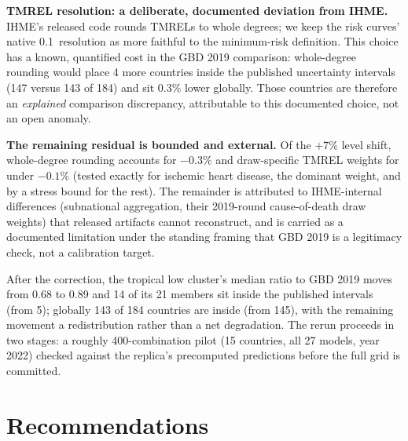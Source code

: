 \documentclass[11pt]{ozreport}
\begin{document}
\textbf{TMREL resolution: a deliberate, documented deviation from IHME.}
IHME's released code rounds TMRELs to whole degrees; we keep the risk
curves' native 0.1\,\textcelsius{} resolution as more faithful to the
minimum-risk definition. This choice has a known, quantified cost in the
GBD 2019 comparison: whole-degree rounding would place 4 more countries
inside the published uncertainty intervals (147 versus 143 of 184) and
sit 0.3\% lower globally. Those countries are therefore an
\emph{explained} comparison discrepancy, attributable to this documented
choice, not an open anomaly.

\textbf{The remaining residual is bounded and external.} Of the $+7\%$
level shift, whole-degree rounding accounts for $-0.3\%$ and draw-specific
TMREL weights for under $-0.1\%$ (tested exactly for ischemic heart
disease, the dominant weight, and by a stress bound for the rest). The
remainder is attributed to IHME-internal differences (subnational
aggregation, their 2019-round cause-of-death draw weights) that released
artifacts cannot reconstruct, and is carried as a documented limitation
under the standing framing that GBD 2019 is a legitimacy check, not a
calibration target.

After the correction, the tropical low cluster's median ratio to GBD 2019
moves from 0.68 to 0.89 and 14 of its 21 members sit inside the published
intervals (from 5); globally 143 of 184 countries are inside (from 145),
with the remaining movement a redistribution rather than a net
degradation. The rerun proceeds in two stages: a roughly 400-combination
pilot (15 countries, all 27 models, year 2022) checked against the
replica's precomputed predictions before the full grid is committed.

\section{Recommendations}\label{sec:rec}
\end{document}
